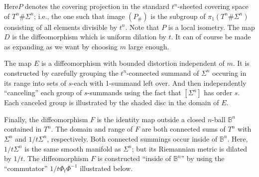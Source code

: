 Here\pageoriginale $P$ denotes the covering projection in the standard $t^n$-sheeted
covering space of $T^n \# \Sigma^n$; i.e., the one such that image
$(P_{\#})$ is the subgroup of $\pi_1 (T^n \# \Sigma^n)$ consisting of
all elements divisible by $t^n$. Note that $P$ is a local
isometry. The map $D$ is the diffeomorphism which is uniform dilation
by $t$. It can of course be made as expanding as we want by choosing
$m$ large enough.

The map $E$ is a diffeomorphism with bounded distortion independent of
$m$. It is constructed by carefully grouping the $t^n$-connected
summand of $\Sigma^n$ occuring in its range into sets of $s$-each with
1-summand left over. And then independently ``canceling'' each group
of $s$-summands using the fact that $[\Sigma^n]$ has order $s$. Each
canceled group is illustrated by the shaded disc in the domain of $E$.

Finally, the diffeomorphism $F$ is the identity map outside a closed
$n$-ball $\mathbb{B}^n$ contained in $T^n$. The domain and range of $F$
are both connected sums of $T^n$ with $\Sigma^n$ and $1/t \Sigma^n$,
respectively. Both connected summings occur inside of
$\mathbb{B}^n$. Here, $1/t \Sigma^n$ is the same smooth manifold as
$\Sigma^n$; but its Riemannian metric is dilated by $1/t$. The
diffeomorphism $F$ is constructed ``inside of $\mathbb{B}^n$'' by
using the ``commutator'' $1/t \Phi_t \Phi^{-1}$ illustrated below.
\begin{figure}[H]
\end{figure}

